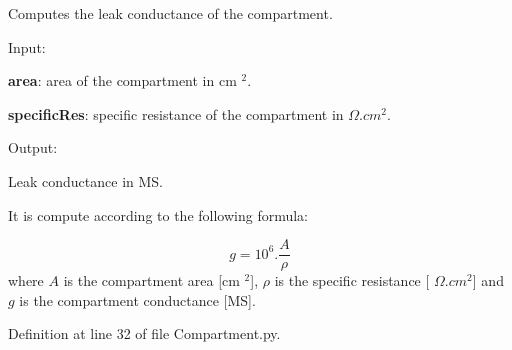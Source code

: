 Computes the leak conductance of the compartment. 


\begin{DoxyItemize}
\item Input\+:
\begin{DoxyItemize}
\item {\bfseries area}\+: area of the compartment in cm $^2$.
\item {\bfseries specific\+Res}\+: specific resistance of the compartment in $\Omega.cm^2$.
\end{DoxyItemize}
\item Output\+:
\begin{DoxyItemize}
\item Leak conductance in MS.
\end{DoxyItemize}
\end{DoxyItemize}

It is compute according to the following formula\+:

\begin{equation} g = 10^6 . \frac{A}{\rho} \end{equation} where $A$ is the compartment area \mbox{[}cm $^2$\mbox{]}, $\rho$ is the specific resistance \mbox{[} $\Omega.cm^2$\mbox{]} and $g$ is the compartment conductance \mbox{[}MS\mbox{]}. 

Definition at line 32 of file Compartment.\+py.

